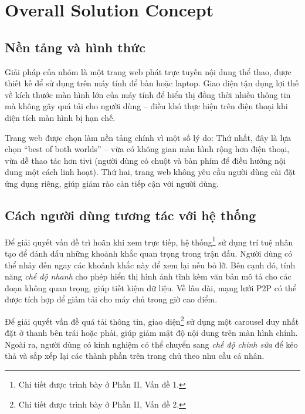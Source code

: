 \section{Overall Solution Concept}


\subsection{Nền tảng và hình thức}

Giải pháp của nhóm là một trang web phát trực tuyến nội dung thể thao, được thiết kế để sử dụng trên máy tính để bàn hoặc laptop. Giao diện tận dụng lợi thế về kích thước màn hình lớn của máy tính để hiển thị đồng thời nhiều thông tin mà không gây quá tải cho người dùng -- điều khó thực hiện trên điện thoại khi diện tích màn hình bị hạn chế.

Trang web được chọn làm nền tảng chính vì một số lý do: Thứ nhất, đây là lựa chọn ``best of both worlds'' -- vừa có không gian màn hình rộng hơn điện thoại, vừa dễ thao tác hơn tivi (người dùng có chuột và bàn phím để điều hướng nội dung một cách linh hoạt). Thứ hai, trang web không yêu cầu người dùng cài đặt ứng dụng riêng, giúp giảm rào cản tiếp cận với người dùng.

\subsection{Cách người dùng tương tác với hệ thống}

Để giải quyết vấn đề trì hoãn khi xem trực tiếp, hệ thống\footnote{Chi tiết được trình bày ở Phần II, Vấn đề 1.} sử dụng trí tuệ nhân tạo để đánh dấu những khoảnh khắc quan trọng trong trận đấu. Người dùng có thể nhảy đến ngay các khoảnh khắc này để xem lại nếu bỏ lỡ. Bên cạnh đó, tính năng \textit{chế độ nhanh} cho phép hiển thị hình ảnh tĩnh kèm văn bản mô tả cho các đoạn không quan trọng, giúp tiết kiệm dữ liệu. Về lâu dài, mạng lưới P2P có thể được tích hợp để giảm tải cho máy chủ trong giờ cao điểm.

Để giải quyết vấn đề quá tải thông tin, giao diện\footnote{Chi tiết được trình bày ở Phần II, Vấn đề 2.} sử dụng một carousel duy nhất đặt ở thanh bên trái hoặc phải, giúp giảm mật độ nội dung trên màn hình chính. Ngoài ra, người dùng có kinh nghiệm có thể chuyển sang \textit{chế độ chỉnh sửa} để kéo thả và sắp xếp lại các thành phần trên trang chủ theo nhu cầu cá nhân.
